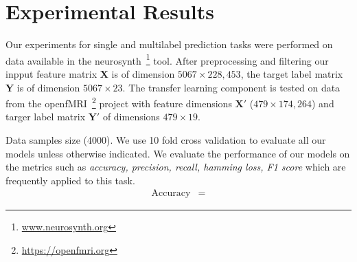 \documentclass{article} %
\begin{document}
\section{Experimental Results}
Our experiments for single and multilabel prediction tasks were performed on data available in the neurosynth~\footnote{\protect \url{www.neurosynth.org}} tool. After preprocessing and filtering our inpput feature matrix  $\mathbf{X}$ is of dimension $5067 \times 228,453$, the target label matrix $\mathbf{Y}$ is of dimension $5067 \times 23$. The transfer learning component is tested on data from the openfMRI~\footnote{\protect \url{https://openfmri.org}} project with feature dimensions $\mathbf{X}'$ ($479 \times 174,264$) and targer label matrix $\mathbf{Y}'$ of dimensions $479 \times 19$.

Data samples size (4000). We use 10 fold cross validation to evaluate all our models unless otherwise indicated. We evaluate the performance of our models on the metrics such as \textit{accuracy, precision, recall, hamming loss, F1 score} which are frequently applied to this task.
\begin{align*}
 \text{Accuracy} &= 
\end{align*}
\end{document}
